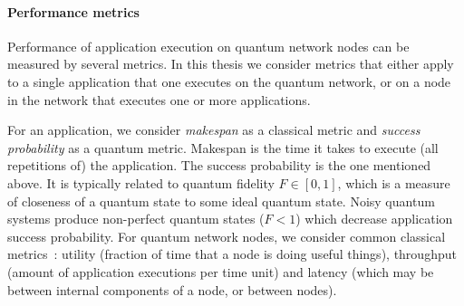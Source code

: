 \paragraph{Performance metrics}
Performance of application execution on quantum network nodes can be measured by several metrics.
In this thesis we consider metrics that either apply to a single application that one executes on the quantum network, or on a node in the network that executes one or more applications.

For an application, we consider \textit{makespan} as a classical metric and \textit{success probability} as a quantum metric.
Makespan is the time it takes to execute (all repetitions of) the application.
The success probability is the one mentioned above.
It is typically related to quantum fidelity $F \in [0, 1]$, which is a measure of closeness of a quantum state to some ideal quantum state.
Noisy quantum systems produce non-perfect quantum states ($F < 1$) which decrease application success probability.
For quantum network nodes, we consider common classical metrics~\cite{stankiewicz_commag}: utility (fraction of time that a node is doing useful things), throughput (amount of application executions per time unit) and latency (which may be between internal components of a node, or between nodes).




\begin{xstretch}
\printbibliography[heading=subbibintoc,title={References},notcategory=noprint]
\end{xstretch}

